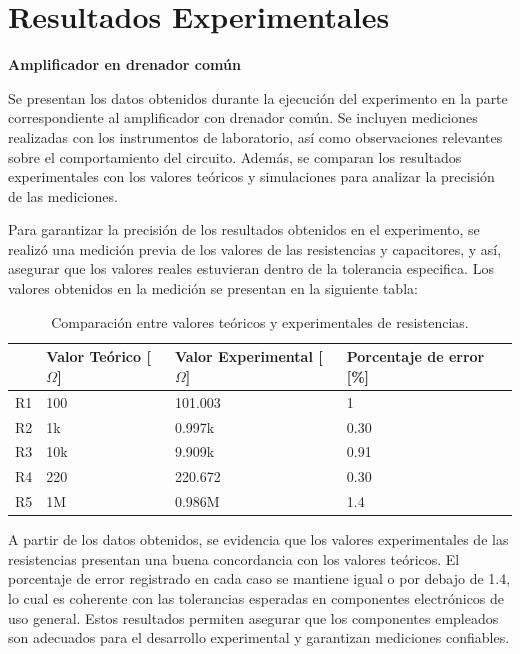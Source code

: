 \documentclass[journal]{IEEEtran}
\begin{document}
	\section{Resultados Experimentales}
	\textbf{Amplificador en drenador común}
	\par Se presentan los datos obtenidos durante la ejecución del experimento en la parte correspondiente al amplificador con drenador común. Se incluyen mediciones realizadas con los instrumentos de laboratorio, así como observaciones relevantes sobre el comportamiento del circuito. Además, se comparan los resultados experimentales con los valores teóricos y simulaciones para analizar la precisión de las mediciones.
	\par Para garantizar la precisión de los resultados obtenidos en el experimento, se realizó una medición previa de los valores de las resistencias y capacitores, y así, asegurar que los valores reales estuvieran dentro de la tolerancia especifica. Los valores obtenidos en la medición se presentan en la siguiente tabla:
	\begin{table}[h]
		\caption{Comparación entre valores teóricos y experimentales de resistencias.}
		\centering
		\renewcommand{\arraystretch}{1.2} %
		\begin{tabular}{|l|p{2cm}|p{2cm}|p{2cm}|}
			\hline
			& \textbf{Valor Teórico [$\Omega$]} & \textbf{Valor Experimental [$\Omega$]} & \textbf{Porcentaje de error [\%]} \\
			\hline
			R1 & 100  & 101.003  & 1 \\
			\hline
			R2 & 1k   & 0.997k  & 0.30 \\
			\hline
			R3 & 10k & 9.909k & 0.91 \\
			\hline
			R4 & 220 & 220.672 & 0.30 \\
			\hline
			R5 & 1M & 0.986M & 1.4 \\
			\hline
		\end{tabular}
		\label{tab:resistencias1}
	\end{table}
	\par A partir de los datos obtenidos, se evidencia que los valores experimentales de las resistencias presentan una buena concordancia con los valores teóricos. El porcentaje de error registrado en cada caso se mantiene igual o por debajo de 1.4, lo cual es coherente con las tolerancias esperadas en componentes electrónicos de uso general. Estos resultados permiten asegurar que los componentes empleados son adecuados para el desarrollo experimental y garantizan mediciones confiables.
\end{document}
